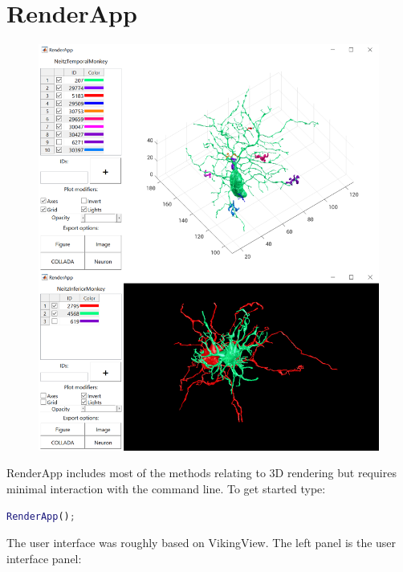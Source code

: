 \documentclass[12pt]{exam}
\begin{document}
	\section{RenderApp}
	\begin{figure}
		\includegraphics[width=\linewidth]{renderapp}
	\end{figure}
	RenderApp includes most of the methods relating to 3D rendering but requires minimal interaction with the command line. To get started type:
	\begin{lstlisting}[language=matlab]
	RenderApp();\end{lstlisting}
	The user interface was roughly based on VikingView. 
	The left panel is the user interface panel:
\end{document}
